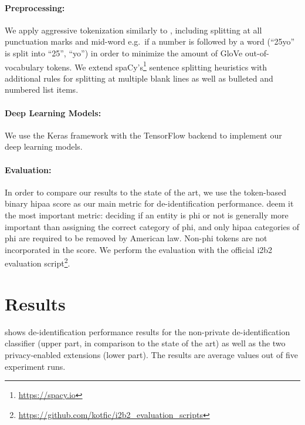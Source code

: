 \paragraph{Preprocessing:}
%
We apply aggressive tokenization similarly to \citet{liu2017identification}, including splitting at all punctuation marks and mid-word e.g.\ if a number is followed by a word (``25yo'' is split into ``25'', ``yo'') in order to minimize the amount of GloVe out-of-vocabulary tokens.
%
We extend spaCy's\footnote{\url{https://spacy.io}} sentence splitting heuristics with additional rules for splitting at multiple blank lines as well as bulleted and numbered list items.

\paragraph{Deep Learning Models:}
%
We use the Keras framework \citep{chollet2015keras} with the TensorFlow backend \citep{abadi2015tensorflow} to implement our deep learning models.
%

\paragraph{Evaluation:}
%
In order to compare our results to the state of the art, we use the token-based binary \ac{hipaa} \fone score as our main metric for de-identification performance.
%
\citet{dernoncourt2017identification} deem it the most important metric: deciding if an entity is \ac{phi} or not is generally more important than assigning the correct category of \ac{phi}, and only \ac{hipaa} categories of \ac{phi} are required to be removed by American law.
%
Non-\ac{phi} tokens are not incorporated in the \fone score.
%
We perform the evaluation with the official i2b2 evaluation script\footnote{\url{https://github.com/kotfic/i2b2\_evaluation\_scripts}}.

\section{Results}
%
 shows de-identification performance results for the non-private de-identification classifier (upper part, in comparison to the state of the art) as well as the two privacy-enabled extensions (lower part).
%
The results are average values out of five experiment runs.


